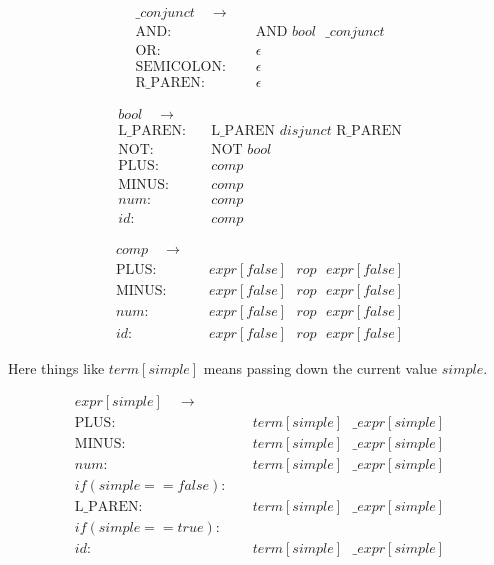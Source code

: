 \documentclass{article}
\begin{document}
\begin{align*}
\_conjunct \quad  \to & \quad\\
\text{AND}: & \quad \text{AND } bool \text{ } \_conjunct\\
\text{OR}: & \quad \epsilon \\
\text{SEMICOLON}: & \quad \epsilon \\
\text{R\_PAREN}: & \quad \epsilon
\end{align*}

\begin{align*}
bool \quad  \to & \quad\\
\text{L\_PAREN}: & \quad \text{L\_PAREN } disjunct \text{ R\_PAREN} \\
\text{NOT}: & \quad \text{NOT } bool \\
\text{PLUS}: & \quad comp \\
\text{MINUS}: & \quad comp \\
num: & \quad comp \\
id: & \quad comp
\end{align*}

\begin{align*}
comp \quad  \to & \quad\\
\text{PLUS}: & \quad expr[false] \text{ } rop  \text{ } expr[false] \\
\text{MINUS}: & \quad expr[false] \text{ } rop  \text{ } expr[false] \\
num: & \quad expr[false] \text{ } rop  \text{ } expr[false] \\
id: & \quad expr[false] \text{ } rop  \text{ } expr[false]
\end{align*}

Here things like $term[simple]$ means passing down the current value $simple$.

\begin{align*}
expr[simple] \quad  \to & \quad\\
\text{PLUS}: & \quad term[simple] \text{ } \_expr[simple] \\
\text{MINUS}: & \quad term[simple] \text{ } \_expr[simple] \\
num: & \quad term[simple] \text{ } \_expr[simple] \\
if (simple == false): &\\
\text{L\_PAREN}: & \quad term[simple] \text{ } \_expr[simple] \\
if (simple == true): &\\
id: & \quad term[simple] \text{ } \_expr[simple] 
\end{align*}
\end{document}
